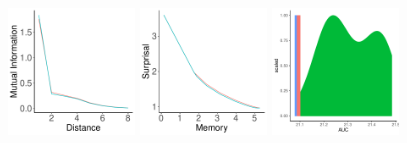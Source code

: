 \documentclass[11pt,letterpaper]{article}
\begin{document}
\begin{figure}
	\begin{center}
\includegraphics[width=0.3\textwidth]{figures/Sesotho-suffixes-byPhonemes-it.pdf}
\includegraphics[width=0.3\textwidth]{figures/Sesotho-suffixes-byPhonemes-memsurp.pdf}
\includegraphics[width=0.3\textwidth]{figures/Sesotho-suffixes-byPhonemes-auc-hist.pdf}


\end{center}
\end{figure}
\end{document}
